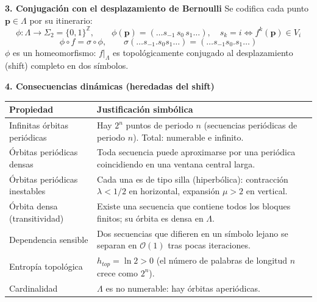 \documentclass[11pt,a4paper]{article}
\newenvironment{solucion}[1][Solución Detallada]{%
    \vspace{1.5mm}%
    \noindent{\large\textbf{Solución:}}\par\vspace{1.5mm}%
}{%
    \par\vspace{3mm}%
}
\begin{document}
\begin{solucion}
\vspace{3.5mm}

\textbf{\large 3. Conjugación con el desplazamiento de Bernoulli}
Se codifica cada punto $\mathbf{p} \in \Lambda$ por su itinerario:
\[
\phi: \Lambda \to \Sigma_2 = \{0,1\}^{\mathbb{Z}}, \qquad \phi(\mathbf{p}) = (\dots s_{-1}\, s_0\, s_1 \dots), \quad s_k = i \iff f^k(\mathbf{p}) \in V_i
\]
\[
\boxed{\phi \circ f = \sigma \circ \phi, \qquad \sigma(\dots s_{-1} . s_0 s_1 \dots) = (\dots s_{-1} s_0 . s_1 \dots)}
\]
$\phi$ es un homeomorfismo: $f|_\Lambda$ es topológicamente conjugado al desplazamiento (shift) completo en dos símbolos.

\vspace{3.5mm}

\textbf{\large 4. Consecuencias dinámicas (heredadas del shift)}
\begin{center}
\renewcommand{\arraystretch}{1.3}
\begin{tabular}{p{4.6cm} p{10.4cm}}
\hline
\textbf{Propiedad} & \textbf{Justificación simbólica} \\ \hline
Infinitas órbitas periódicas & Hay $2^n$ puntos de periodo $n$ (secuencias periódicas de periodo $n$). Total: numerable e infinito. \\
Órbitas periódicas densas & Toda secuencia puede aproximarse por una periódica coincidiendo en una ventana central larga. \\
Órbitas periódicas inestables & Cada una es de tipo silla (hiperbólica): contracción $\lambda<1/2$ en horizontal, expansión $\mu>2$ en vertical. \\
Órbita densa (transitividad) & Existe una secuencia que contiene todos los bloques finitos; su órbita es densa en $\Lambda$. \\
Dependencia sensible & Dos secuencias que difieren en un símbolo lejano se separan en $\mathcal{O}(1)$ tras pocas iteraciones. \\
Entropía topológica & $h_{top} = \ln 2 > 0$ (el número de palabras de longitud $n$ crece como $2^n$). \\
Cardinalidad & $\Lambda$ es no numerable: hay órbitas aperiódicas. \\ \hline
\end{tabular}
\end{center}

\vspace{3.5mm}


\end{solucion}
\end{document}
